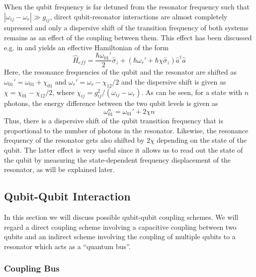 When the qubit frequency is far detuned from the resonator frequency such that $|\omega_{ij}-\omega_r| \gg g_{ij}$, direct qubit-resonator interactions are almost completely supressed and only a dispersive shift of the transition frequency of both systems remains as an effect of the coupling between them. This effect has been discussed e.g. in \cite{koch_charge-insensitive_2007} and yields an effective Hamiltonian of the form
%
\begin{equation}
\hat{H}_{eff} = \frac{\hbar\omega_{01}'}{2}\hat{\sigma}_z+(\hbar\omega_r'+\hbar \chi \hat{\sigma}_z)\hat{a}^\dagger \hat{a}
\end{equation}
%
Here, the resonance frequencies of the qubit and the resonator are shifted as $\omega_{01}'=\omega_{01}+\chi_{01}$ and $\omega_r' = \omega_{r}-\chi_{12}/2$ and the dispersive shift is given as $\chi=\chi_{01}-\chi_{12}/2$, where $\chi_{ij}=g_{ij}^2/(\omega_{ij}-\omega_r)$. As can be seen, for a state with $n$ photons, the energy difference between the two qubit levels is given as
%
\begin{equation}
\omega_{01}^n = \omega_{01}'+2\chi n
\end{equation}
%
Thus, there is a dispersive shift of the qubit transition frequency that is proportional to the number of photons in the resonator. Likewise, the resonance frequency of the resonator gets also shifted by $2\chi$ depending on the state of the qubit. The latter effect is very useful since it allows us to read out the state of the qubit by measuring the state-dependent frequency displacement of the resonator, as will be explained later.
\subsection{Qubit-Qubit Interaction}

In this section we will discuss possible qubit-qubit coupling schemes. We will regard a direct coupling scheme involving a capacitive coupling between two qubits and an indirect scheme involving the coupling of multiple qubits to a resonator which acts as a ``quantum bus''.

\subsubsection{Coupling Bus}

